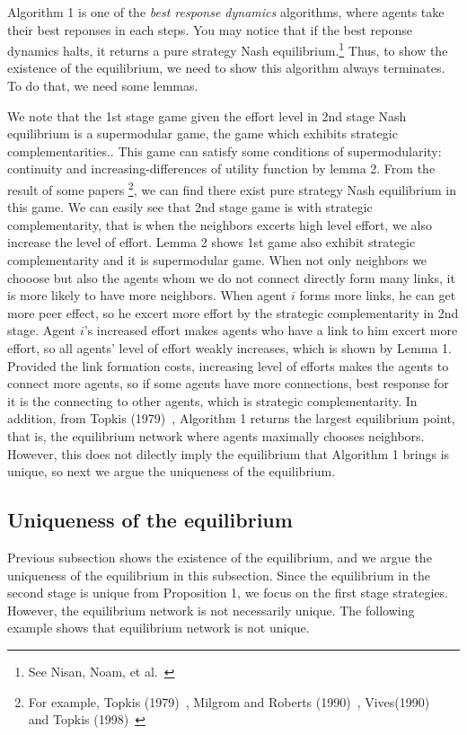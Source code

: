 \documentclass[12pt]{article}
\theoremstyle{definition}
\begin{document}
Algorithm 1 is one of the {\it{best response dynamics}} algorithms, where agents take their best reponses in each steps.
You may notice that if the best reponse dynamics halts, it returns a pure strategy Nash equilibrium.\footnote{See Nisan, Noam, et al.~\cite{AGT}}
Thus, to show the existence of the equilibrium, we need to show this algorithm always terminates.
To do that, we need some lemmas.

We note that the 1st stage game given the effort level in 2nd stage Nash equilibrium is a supermodular game, the game which exhibits strategic complementarities..
This game can satisfy some conditions of supermodularity: continuity and increasing-differences of utility function by lemma 2.
From the result of some papers \footnote{For example, Topkis (1979)~\cite{topkis1979}, Milgrom and Roberts (1990)~\cite{milgromroberts}, Vives(1990)~\cite{vives} and Topkis (1998)~\cite{topkis1998}}, we can find there exist pure strategy Nash equilibrium in this game.
We can easily see that 2nd stage game is with strategic complementarity, that is when the neighbors excerts high level effort, we also increase the level of effort.
Lemma 2 shows 1st game also exhibit strategic complementarity and it is supermodular game.
When not only neighbors we chooose but also the agents whom we do not connect directly form many links, it is more likely to have more neighbors.
When agent $i$ forms more links, he can get more peer effect, so he excert more effort by the strategic complementarity in 2nd stage.
Agent $i$'s increased effort makes agents who have a link to him excert more effort, so all agents' level of effort weakly increases, which is shown by Lemma 1.
Provided the link formation costs, increasing level of efforts makes the agents to connect more agents, so if some agents have more connections, best response for it is the connecting to other agents, which is strategic complementarity.
In addition, from Topkis (1979)~\cite{topkis1979}, Algorithm 1 returns the largest equilibrium point, that is, the equilibrium network where agents maximally chooses neighbors.
However, this does not dilectly imply the equilibrium that Algorithm 1 brings is unique, so next we argue the uniqueness of the equilibrium.


\subsection{Uniqueness of the equilibrium}

Previous subsection shows the existence of the equilibrium, and we argue the uniqueness of the equilibrium in this subsection.
Since the equilibrium in the second stage is unique from Proposition 1, we focus on the first stage strategies.
However, the equilibrium network is not necessarily unique.
The following example shows that equilibrium network is not unique.
\end{document}
